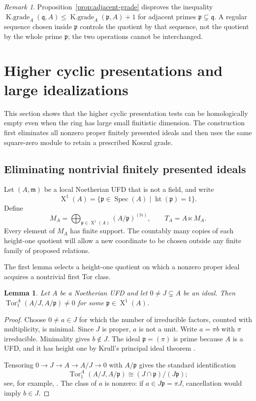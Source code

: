\documentclass[11pt]{amsart}
\numberwithin{equation}{section}
\newtheorem{lemma}[theorem]{Lemma}
\theoremstyle{definition}
\theoremstyle{remark}
\newtheorem{remark}[theorem]{Remark}
\newcommand{\Tor}{\operatorname{Tor}}
\newcommand{\Spec}{\operatorname{Spec}}
\newcommand{\htp}{\operatorname{ht}}
\newcommand{\Kgr}{\operatorname{K.grade}}
\newcommand{\SpecOne}{\operatorname{X}^{1}}
\begin{document}
\begin{remark}\label{rem:adjacent-warning}
Proposition~\ref{prop:adjacent-grade} disproves the inequality $\Kgr_A(\mathfrak q,A)\leq\Kgr_A(\mathfrak p,A)+1$ for adjacent primes $\mathfrak p\subsetneq\mathfrak q$.  A regular sequence chosen inside $\mathfrak p$ controls the quotient by that sequence, not the quotient by the whole prime $\mathfrak p$; the two operations cannot be interchanged.
\end{remark}

\section{Higher cyclic presentations and large idealizations}\label{sec:cyclic}

This section shows that the higher cyclic presentation tests can be homologically empty even when the ring has large small finitistic dimension.  The construction first eliminates all nonzero proper finitely presented ideals and then uses the same square-zero module to retain a prescribed Koszul grade.

\subsection{Eliminating nontrivial finitely presented ideals}

Let $(A,\mathfrak m)$ be a local Noetherian UFD that is not a field, and write
\[
 \SpecOne(A)=\{\mathfrak p\in\Spec(A)\mid\htp(\mathfrak p)=1\}.
\]
Define
\begin{equation}\label{eq:large-idealization}
 M_A=\bigoplus_{\mathfrak p\in\SpecOne(A)}(A/\mathfrak p)^{(\mathbb N)},
 \qquad
 T_A=A\ltimes M_A.
\end{equation}
Every element of $M_A$ has finite support.  The countably many copies of each height-one quotient will allow a new coordinate to be chosen outside any finite family of proposed relations.

The first lemma selects a height-one quotient on which a nonzero proper ideal acquires a nontrivial first Tor class.

\begin{lemma}\label{lem:height-one-Tor}
Let $A$ be a Noetherian UFD and let $0\neq J\subsetneq A$ be an ideal.  Then $\Tor_1^A(A/J,A/\mathfrak p)\neq0$ for some $\mathfrak p\in\SpecOne(A)$.
\end{lemma}

\begin{proof}
Choose $0\neq a\in J$ for which the number of irreducible factors, counted with multiplicity, is minimal.  Since $J$ is proper, $a$ is not a unit.  Write $a=\pi b$ with $\pi$ irreducible.  Minimality gives $b\notin J$.  The ideal $\mathfrak p=(\pi)$ is prime because $A$ is a UFD, and it has height one by Krull's principal ideal theorem \cite[Chapter~11]{AtiyahMacdonald}.

Tensoring $0\to J\to A\to A/J\to0$ with $A/\mathfrak p$ gives the standard identification
\[
 \Tor_1^A(A/J,A/\mathfrak p)
 \cong (J\cap\mathfrak p)/(J\mathfrak p);
\]
see, for example, \cite[Chapter~7]{Rotman}.  The class of $a$ is nonzero: if $a\in J\mathfrak p=\pi J$, cancellation would imply $b\in J$.
\end{proof}
\end{document}
